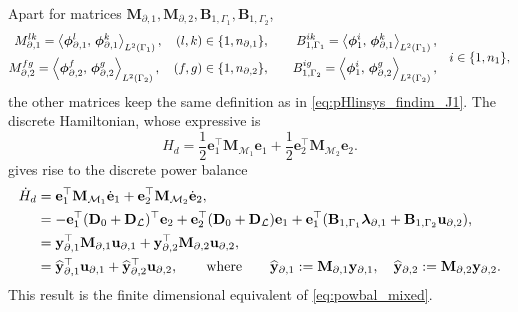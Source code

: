 Apart for matrices $\mathbf{M}_{\partial, 1}, \mathbf{M}_{\partial, 2}, \mathbf{B}_{1, \Gamma_1}, \mathbf{B}_{1, \Gamma_2}$,
\begin{equation}
\begin{aligned}
{M}_{\partial, 1}^{lk} = \inner[L^2(\Gamma_1)]{\bm{\phi}_{\partial, 1}^l}{\bm{\phi}_{\partial, 1}^k}, \quad (l,k) \in \{1,n_{\partial, 1}\}, \\
{M}_{\partial, 2}^{fg} = \inner[L^2(\Gamma_2)]{\bm{\phi}_{\partial, 2}^f}{\bm{\phi}_{\partial, 2}^g}, \quad (f,g) \in \{1,n_{\partial, 2}\},\\
\end{aligned}  \qquad
\begin{aligned}
{B}_{1, \Gamma_1}^{ik} = \inner[L^2(\Gamma_1)]{\bm{\phi}_{1}^i}{\bm{\phi}_{\partial, 1}^k}, \\
{B}_{1, \Gamma_2}^{ig} = \inner[L^2(\Gamma_2)]{\bm{\phi}_{1}^i}{\bm{\phi}_{\partial, 2}^g}, \\
\end{aligned} \quad i \in \{1,n_1\},
\end{equation} 
the other matrices keep the same definition as in \eqref{eq:pHlinsys_findim_J1}. The discrete Hamiltonian, whose expressive is \cite{beattie2018linear}
\begin{equation}
H_d = \frac{1}{2} \mathbf{e}_1^\top \mathbf{M}_{\mathcal{M}_1} \mathbf{e}_1 + \frac{1}{2} \mathbf{e}_2^\top \mathbf{M}_{\mathcal{M}_2} \mathbf{e}_2.
\end{equation}
gives rise to the discrete power balance
\begin{equation}
\begin{aligned}
\dot{H}_d &= \mathbf{e}_1^\top \mathbf{M}_{\mathcal{M}_1} \dot{\mathbf{e}}_1 + \mathbf{e}_2^\top \mathbf{M}_{\mathcal{M}_2} \dot{\mathbf{e}}_2, \\
&= -\mathbf{e}_1^\top (\mathbf{D}_0+\mathbf{D}_\mathcal{L})^\top {\mathbf{e}}_2 + \mathbf{e}_2^\top (\mathbf{D}_0+\mathbf{D}_\mathcal{L}) {\mathbf{e}}_1 + \mathbf{e}_1^\top (\mathbf{B}_{1, \Gamma_1} \bm{\lambda}_{\partial, 1} + \mathbf{B}_{1, \Gamma_2} \mathbf{u}_{\partial, 2} ), \\
&= \mathbf{y}_{\partial, 1}^\top \mathbf{M}_{\partial, 1} \mathbf{u}_{\partial, 1} + \mathbf{y}_{\partial, 2}^\top \mathbf{M}_{\partial, 2} \mathbf{u}_{\partial, 2}, \\
&= \widehat{\mathbf{y}}_{\partial, 1}^\top \mathbf{u}_{\partial, 1} + \widehat{\mathbf{y}}_{\partial, 2}^\top \mathbf{u}_{\partial, 2}, \where \widehat{\mathbf{y}}_{\partial, 1} :=\mathbf{M}_{\partial, 1} \mathbf{y}_{\partial, 1}, \quad \widehat{\mathbf{y}}_{\partial, 2} :=\mathbf{M}_{\partial, 2} \mathbf{y}_{\partial, 2}.
\end{aligned}
\end{equation}
This result is the finite dimensional equivalent of \eqref{eq:powbal_mixed}.


